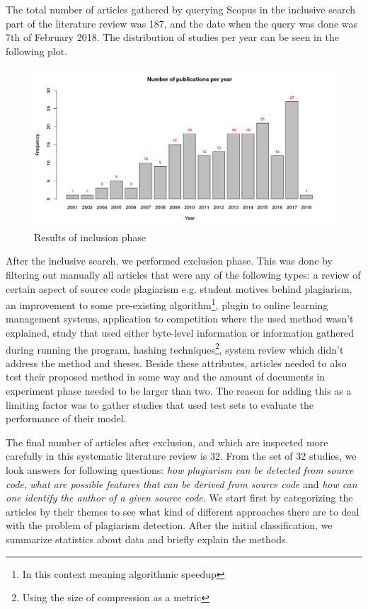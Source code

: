 The total number of articles gathered by querying Scopus in the inclusive search part of the literature review was 187, and the date when the query was done was 7th of February 2018. The distribution of studies per year can be seen in the following plot.

\begin{figure}[ht]
\centering
\includegraphics[width=\textwidth]{plots/Rplot.png}
\caption{Results of inclusion phase}
\end{figure}

After the inclusive search, we performed exclusion phase. This was done by filtering out manually all articles that were any of the following types: a review of certain aspect of source code plagiarism e.g. student motives behind plagiarism, an improvement to some pre-existing algorithm\footnote{In this context meaning algorithmic speedup}, plugin to online learning management systems, application to competition where the used method wasn't explained, study that used either byte-level information or information gathered during running the program, hashing techniques\footnote{Using the size of compression as a metric}, system review which didn't address the method and theses. Beside these attributes, articles needed to also test their proposed method in some way and the amount of documents in experiment phase needed to be larger than two. The reason for adding this as a limiting factor was to gather studies that used test sets to evaluate the performance of their model.

The final number of articles after exclusion, and which are inspected more carefully in this systematic literature review is 32. From the set of 32 studies, we look answers for following questions: \emph{how plagiarism can be detected from source code}, \emph{what are possible features that can be derived from source code} and \emph{how can one identify the author of a given source code}. We start first by categorizing the articles by their themes to see what kind of different approaches there are to deal with the problem of plagiarism detection. After the initial classification, we summarize statistics about data and briefly explain the methods.


